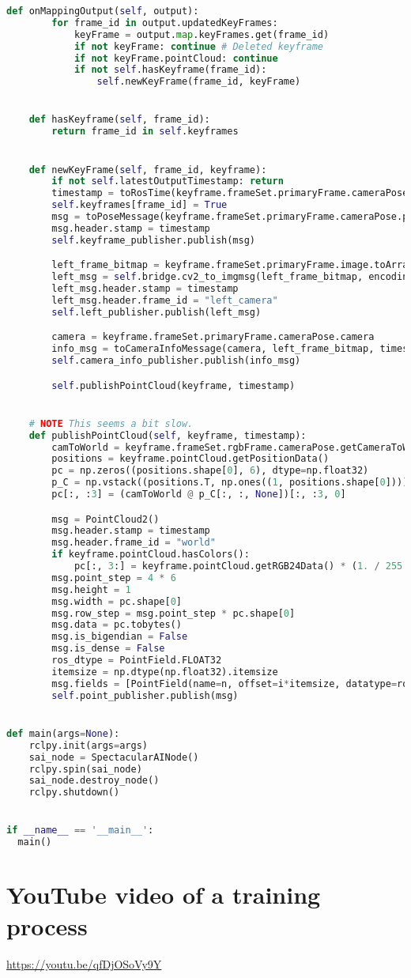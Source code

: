 \begin{lstlisting}[language=python,frame=single]
    def onMappingOutput(self, output):
        for frame_id in output.updatedKeyFrames:
            keyFrame = output.map.keyFrames.get(frame_id)
            if not keyFrame: continue # Deleted keyframe
            if not keyFrame.pointCloud: continue
            if not self.hasKeyframe(frame_id):
                self.newKeyFrame(frame_id, keyFrame)


    def hasKeyframe(self, frame_id):
        return frame_id in self.keyframes


    def newKeyFrame(self, frame_id, keyframe):
        if not self.latestOutputTimestamp: return
        timestamp = toRosTime(keyframe.frameSet.primaryFrame.cameraPose.pose.time)
        self.keyframes[frame_id] = True
        msg = toPoseMessage(keyframe.frameSet.primaryFrame.cameraPose.pose, timestamp)
        msg.header.stamp = timestamp
        self.keyframe_publisher.publish(msg)

        left_frame_bitmap = keyframe.frameSet.primaryFrame.image.toArray()
        left_msg = self.bridge.cv2_to_imgmsg(left_frame_bitmap, encoding="mono8")
        left_msg.header.stamp = timestamp
        left_msg.header.frame_id = "left_camera"
        self.left_publisher.publish(left_msg)

        camera = keyframe.frameSet.primaryFrame.cameraPose.camera
        info_msg = toCameraInfoMessage(camera, left_frame_bitmap, timestamp)
        self.camera_info_publisher.publish(info_msg)

        self.publishPointCloud(keyframe, timestamp)


    # NOTE This seems a bit slow.
    def publishPointCloud(self, keyframe, timestamp):
        camToWorld = keyframe.frameSet.rgbFrame.cameraPose.getCameraToWorldMatrix()
        positions = keyframe.pointCloud.getPositionData()
        pc = np.zeros((positions.shape[0], 6), dtype=np.float32)
        p_C = np.vstack((positions.T, np.ones((1, positions.shape[0])))).T
        pc[:, :3] = (camToWorld @ p_C[:, :, None])[:, :3, 0]

        msg = PointCloud2()
        msg.header.stamp = timestamp
        msg.header.frame_id = "world"
        if keyframe.pointCloud.hasColors():
            pc[:, 3:] = keyframe.pointCloud.getRGB24Data() * (1. / 255.)
        msg.point_step = 4 * 6
        msg.height = 1
        msg.width = pc.shape[0]
        msg.row_step = msg.point_step * pc.shape[0]
        msg.data = pc.tobytes()
        msg.is_bigendian = False
        msg.is_dense = False
        ros_dtype = PointField.FLOAT32
        itemsize = np.dtype(np.float32).itemsize
        msg.fields = [PointField(name=n, offset=i*itemsize, datatype=ros_dtype, count=1) for i, n in enumerate('xyzrgb')]
        self.point_publisher.publish(msg)


def main(args=None):
    rclpy.init(args=args)
    sai_node = SpectacularAINode()
    rclpy.spin(sai_node)
    sai_node.destroy_node()
    rclpy.shutdown()


if __name__ == '__main__':
  main()
\end{lstlisting}

\section{YouTube video of a training process} \label{yt_gsplat}

\url{https://youtu.be/qfDjOSoVy9Y}
